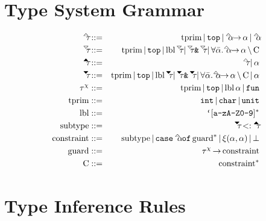 \documentclass{article}
\begin{document}
\section*{Type System Grammar}

\begin{eqnarray*}
    \tauUpOpen      &::=&       \tprim
                           \gOr \gtTop
                           \gOr \alphaUp \fto \alpha
                           \gOr \alphaUp
\\
    \tauDownOpen    &::=&       \tprim
                           \gOr \gtTop
                           \gOr \lbl \tauDownOpen
                           \gOr \tauDownOpen \gtAmp \tauDownOpen
                           \gOr \forall \alphaList. \alphaUp \fto \alpha \cSeparator \constraintList
\\
    \tauUpClosed    &::=&       \tauUpOpen
                           \gOr \alpha
\\
    \tauDownClosed  &::=&       \tprim
                           \gOr \gtTop
                           \gOr \lbl \tauDownClosed
                           \gOr \tauDownClosed \gtAmp \tauDownClosed
                           \gOr \forall \alphaList. \alphaUp \fto \alpha \cSeparator \constraintList
                           \gOr \alpha
\\
    \tauChi         &::=&       \tprim
                           \gOr \gtTop
                           \gOr \lbl \alpha
                           \gOr \gtFun
\\
    \tprim          &::=&       \gtInt
                           \gOr \gtChar
                           \gOr \gtUnit
\\
    \lbl            &::=&       \gtBt [\texttt{a-zA-Z0-9}]^*
\\
    \subtype        &::=&       \tauDownClosed <: \tauUpClosed
\\
    \constraint     &::=&       \subtype
                           \gOr \gtCase \alphaUp \gtOf \guard^*
                           \gOr \equatable{\alpha}{\alpha}
                           \gOr \gtBottom
\\
    \guard          &::=&       \tauChi \fto \constraint
\\
    \constraintList &::=&       \constraint^*
\end{eqnarray*}

\section*{Type Inference Rules}
\end{document}
